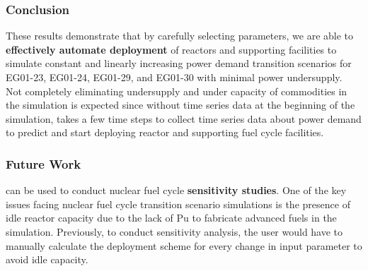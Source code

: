 \begin{frame}
  \frametitle{Conclusion}
        These results demonstrate that by carefully selecting \deploy 
        parameters, we are able to \textbf{effectively automate deployment}
        of reactors and supporting facilities to simulate
        constant and linearly increasing power demand transition scenarios
        for EG01-23, EG01-24, EG01-29, and EG01-30 with minimal 
        power undersupply. 
        \vspace{1em}
        \\
        Not completely eliminating undersupply and under capacity of 
        commodities in the simulation is expected 
        since without time series data 
        at the beginning of the simulation, \deploy takes a few 
        time steps to collect time series data about power demand 
        to predict and start deploying reactor and supporting 
        fuel cycle facilities. 
        
\end{frame}

\begin{frame}
  \frametitle{Future Work}
  \deploy can be used to conduct nuclear fuel cycle \textbf{sensitivity studies}. 
  One of the key issues facing nuclear fuel cycle transition scenario 
  simulations is the presence 
  of idle reactor capacity due to the lack of Pu to fabricate advanced fuels 
  in the simulation. 
  Previously, to conduct sensitivity analysis,  the user would have to manually 
  calculate the deployment scheme for every change in input parameter to avoid 
  idle capacity. 
\end{frame}